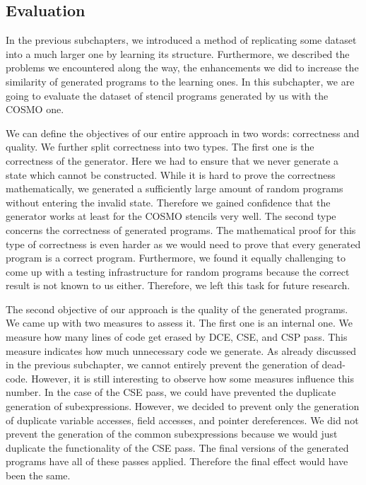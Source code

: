 \documentclass[sigplan,\review anonymous]{acmart}
\begin{document}
\subsection{Evaluation}
In the previous subchapters, we introduced a method of replicating some dataset
into a much larger one by learning its structure. Furthermore, we described the
problems we encountered along the way, the enhancements we did to increase the
similarity of generated programs to the learning ones. In this subchapter, we
are going to evaluate the dataset of stencil programs generated by us with the
COSMO one.

We can define the objectives of our entire approach in two words: correctness
and quality. We further split correctness into two types. The first one is the
correctness of the generator. Here we had to ensure that we never generate a
state which cannot be constructed. While it is hard to prove the correctness
mathematically, we generated a sufficiently large amount of random programs
without entering the invalid state. Therefore we gained confidence that the
generator works at least for the COSMO stencils very well. The second type
concerns the correctness of generated programs. The mathematical proof for
this type of correctness is even harder as we would need to prove that every
generated program is a correct program. Furthermore, we found it equally
challenging to come up with a testing infrastructure for random programs
because the correct result is not known to us either. Therefore, we left this
task for future research.

The second objective of our approach is the quality of the generated programs.
We came up with two measures to assess it. The first one is an internal one.
We measure how many lines of code get erased by DCE, CSE, and CSP pass. This
measure indicates how much unnecessary code we generate. As already discussed
in the previous subchapter, we cannot entirely prevent the generation of
dead-code. However, it is still interesting to observe how some measures
influence this number. In the case of the CSE pass, we could have prevented
the duplicate generation of subexpressions. However, we decided to prevent
only the generation of duplicate variable accesses, field accesses, and pointer
dereferences. We did not prevent the generation of the common subexpressions
because we would just duplicate the functionality of the CSE pass. The final
versions of the generated programs have all of these passes applied. Therefore
the final effect would have been the same.
\end{document}
